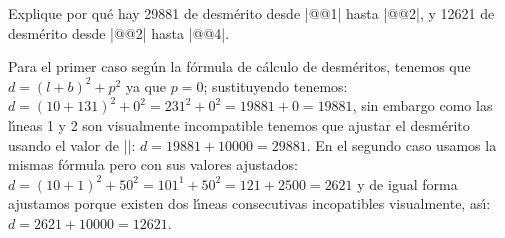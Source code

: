 


\bigskip

\enunciadoS Explique por qu\'e hay 29881 de desm\'erito desde |@@1|
hasta |@@2|, y 12621 de desmérito desde |@@2| hasta |@@4|.

\bigskip

\respuestaS Para el primer caso seg\'un la f\'ormula de c\'alculo de 
desm\'eritos, tenemos que $d = (l + b)^2 + p^2$ ya que $p = 0$;
sustituyendo tenemos: $d = (10 + 131)^2 + 0^2 = 231^2 + 0^2 = 19881 +
0 = 19881$, sin embargo como las l\'{\i}neas 1 y 2 son visualmente
incompatible tenemos que ajustar el desm\'erito usando el valor de
|\adjmerits|: $d = 19881 + 10000 = 29881$. En el segundo caso usamos
la mismas f\'ormula pero con sus valores ajustados: $d = (10 + 1)^2 +
50^2 = 101^1 + 50^2 = 121 + 2500 = 2621$ y de igual forma ajustamos
porque existen dos l\'{\i}neas consecutivas incopatibles visualmente,
as\'{\i}: $d = 2621 + 10000 = 12621$.

\bye

